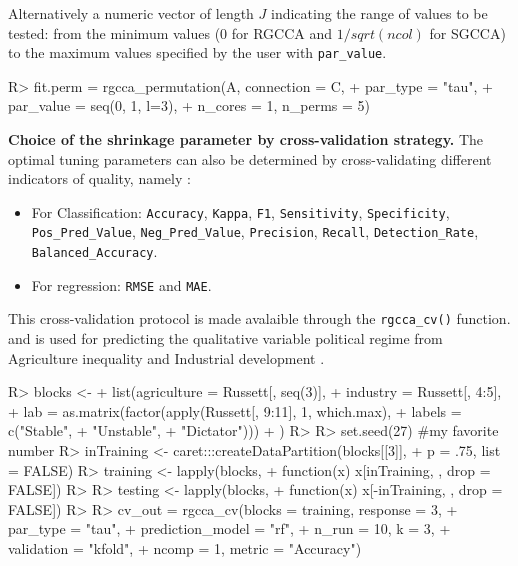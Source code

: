 \documentclass[
]{jss}
\begin{document}
Alternatively a numeric vector of length \(J\) indicating the range of
values to be tested: from the minimum values (0 for RGCCA and
\(1/sqrt(ncol)\) for SGCCA) to the maximum values specified by the user
with \texttt{par\_value}.

\begin{CodeChunk}
\begin{CodeInput}
R> fit.perm = rgcca_permutation(A, connection = C,
+                              par_type = "tau",
+                              par_value = seq(0, 1, l=3),
+                              n_cores = 1, n_perms = 5)
\end{CodeInput}
\end{CodeChunk}

\textbf{Choice of the shrinkage parameter by cross-validation strategy.}
The optimal tuning parameters can also be determined by cross-validating
different indicators of quality, namely :

\begin{itemize}
\item
  For Classification: \texttt{Accuracy}, \texttt{Kappa}, \texttt{F1},
  \texttt{Sensitivity}, \texttt{Specificity}, \texttt{Pos\_Pred\_Value},
  \texttt{Neg\_Pred\_Value}, \texttt{Precision}, \texttt{Recall},
  \texttt{Detection\_Rate}, \texttt{Balanced\_Accuracy}.
\item
  For regression: \texttt{RMSE} and \texttt{MAE}.
\end{itemize}

This cross-validation protocol is made avalaible through the
\texttt{rgcca\_cv()} function. and is used for predicting the
qualitative variable political regime from Agriculture inequality and
Industrial development .

\begin{CodeChunk}
\begin{CodeInput}
R> blocks <- 
+   list(agriculture = Russett[, seq(3)],
+        industry = Russett[, 4:5],
+        lab = as.matrix(factor(apply(Russett[, 9:11], 1, which.max),
+                        labels = c("Stable", 
+                                   "Unstable",
+                                   "Dictator")))
+                )
R> 
R> set.seed(27) #my favorite number
R> inTraining <- caret:::createDataPartition(blocks[[3]], 
+                                   p = .75, list = FALSE)
R> training <- lapply(blocks, 
+                    function(x) x[inTraining, , drop = FALSE])
R> 
R> testing  <- lapply(blocks, 
+                    function(x) x[-inTraining, , drop = FALSE])
R> 
R> cv_out = rgcca_cv(blocks = training, response = 3, 
+                   par_type = "tau", 
+                   prediction_model = "rf", 
+                   n_run = 10, k = 3,
+                   validation = "kfold", 
+                   ncomp = 1, metric = "Accuracy")
\end{CodeInput}
\end{CodeChunk}
\end{document}
